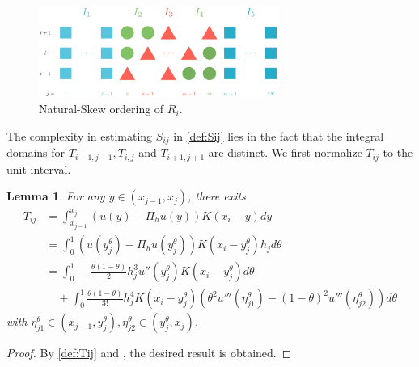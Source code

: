 \documentclass{amsart}
\newtheorem{lemma}[theorem]{Lemma}
\theoremstyle{definition}
\theoremstyle{remark}
\numberwithin{equation}{section}
\begin{document}
\begin{figure}[htbp]
  \centering 
  \includegraphics[width=0.7\textwidth]{Depart.png}
  \caption{Natural-Skew ordering of \(R_i\).}
  \label{fig:depart}
\end{figure}

The complexity in estimating \(S_{ij}\) in \eqref{def:Sij} lies in the fact that the integral domains for  \(T_{i-1, j-1}, T_{i,j}\) and \(T_{i+1,j+1}\) are distinct.
We first normalize $T_{ij}$ to the unit interval.

\begin{lemma} \label{lmm:Tij-normalized}
  For any \(y\in (x_{j-1}, x_{j})\), there exits %
  \begin{equation*} %
    \begin{aligned}
      T_{ij} & = \int_{x_{j-1}}^{x_{j}} (u(y) - \Pi_hu(y)) K(x_i - y) dy  \\
             & = \int_{0}^{1} (u(y_j^\theta) - \Pi_hu(y_j^\theta)) K(x_i - y_j^\theta) h_j d\theta  \\
             & = \int_{0}^{1}
      -\frac{\theta (1-\theta)}{2} h_j^3 u''(y_j^\theta) K(x_i - y_j^\theta) d\theta   \\
             & \quad +  \int_{0}^{1} \frac{\theta (1-\theta)}{3!} h_j^4  K(x_i - y_j^\theta) \left( \theta^2 u'''(\eta_{j1}^\theta) - (1-\theta)^2 u'''(\eta_{j2}^\theta) \right) d\theta
    \end{aligned}
  \end{equation*}
  with \(\eta_{j1}^\theta \in (x_{j-1}, y_j^\theta), \eta_{j2}^\theta \in (y_j^\theta, x_j)\).
\end{lemma}
\begin{proof}
  By \eqref{def:Tij} and , the desired result is obtained.
\end{proof}
\end{document}
